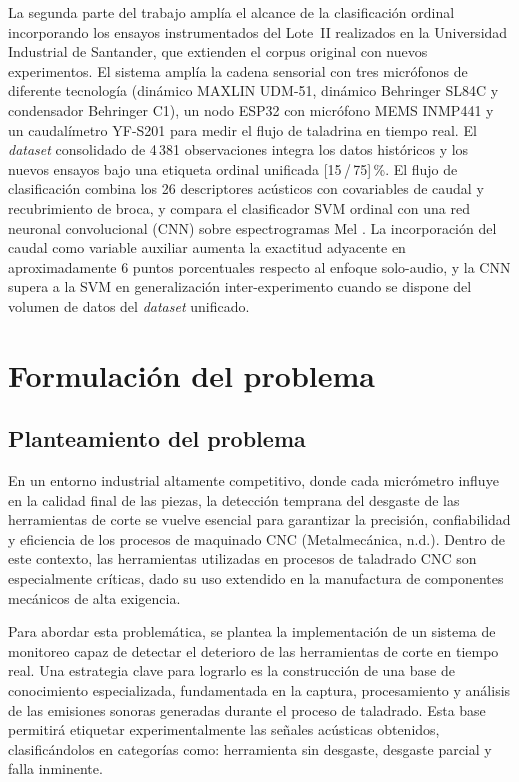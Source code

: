 \documentclass[12pt, letterpaper]{report}
\begin{document}
La segunda parte del trabajo amplía el alcance de la clasificación ordinal incorporando los ensayos instrumentados del Lote~II realizados en la Universidad Industrial de Santander, que extienden el corpus original con nuevos experimentos. El sistema amplía la cadena sensorial con tres micrófonos de diferente tecnología (dinámico MAXLIN UDM-51, dinámico Behringer SL84C y condensador Behringer C1), un nodo ESP32 con micrófono MEMS INMP441 y un caudalímetro YF-S201 para medir el flujo de taladrina en tiempo real. El \textit{dataset} consolidado de 4\,381 observaciones integra los datos históricos y los nuevos ensayos bajo una etiqueta ordinal unificada [15\,/\,75]\,\%. El flujo de clasificación combina los 26 descriptores acústicos con covariables de caudal y recubrimiento de broca, y compara el clasificador SVM ordinal con una red neuronal convolucional (CNN) sobre espectrogramas Mel \cite{geron2023}. La incorporación del caudal como variable auxiliar aumenta la exactitud adyacente en aproximadamente 6 puntos porcentuales respecto al enfoque solo-audio, y la CNN supera a la SVM en generalización inter-experimento cuando se dispone del volumen de datos del \textit{dataset} unificado.

\clearpage
\chapter{Formulación del problema}

\section{Planteamiento del problema}

En un entorno industrial altamente competitivo, donde cada micrómetro influye en la calidad final de las piezas, la detección temprana del desgaste de las herramientas de corte se vuelve esencial para garantizar la precisión, confiabilidad y eficiencia de los procesos de maquinado CNC (Metalmecánica, n.d.). Dentro de este contexto, las herramientas utilizadas en procesos de taladrado CNC son especialmente críticas, dado su uso extendido en la manufactura de componentes mecánicos de alta exigencia.

Para abordar esta problemática, se plantea la implementación de un sistema de monitoreo capaz de detectar el deterioro de las herramientas de corte en tiempo real. Una estrategia clave para lograrlo es la construcción de una base de conocimiento especializada, fundamentada en la captura, procesamiento y análisis de las emisiones sonoras generadas durante el proceso de taladrado. Esta base permitirá etiquetar experimentalmente las señales acústicas obtenidos, clasificándolos en categorías como: herramienta sin desgaste, desgaste parcial y falla inminente.
\end{document}
